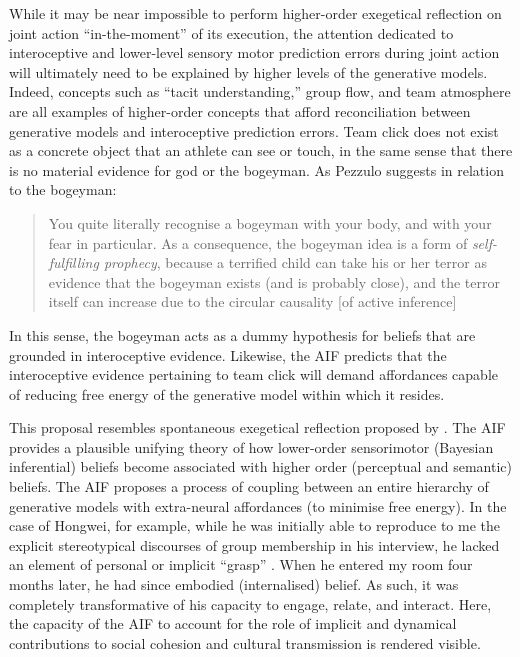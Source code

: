\begin{CJK}{UTF8}{gbsn}

While it may be near impossible to perform higher-order exegetical reflection on joint action ``in-the-moment'' of its execution, the attention dedicated to interoceptive and lower-level sensory motor prediction errors during joint action will ultimately need to be explained by higher levels of the generative models. Indeed, concepts such as ``tacit understanding,'' group flow, and team atmosphere are all examples of higher-order concepts that afford reconciliation between generative models and interoceptive prediction errors.  Team click does not exist as a concrete object that an athlete can see or touch, in the same sense that there is no material evidence for god or the bogeyman.  As Pezzulo suggests in relation to the bogeyman:

    \begin{quote}
      You quite literally recognise a bogeyman with your body, and with your fear in particular.  As a consequence, the bogeyman idea is a form of \textit{self-fulfilling prophecy}, because a terrified child can take his or her terror as evidence that the bogeyman exists (and is probably close), and the terror itself can increase due to the circular causality [of active inference] \citep[909]{Pezzulo2014}
    \end{quote}

In this sense, the bogeyman acts as a dummy hypothesis for beliefs that are grounded in interoceptive evidence.  Likewise, the AIF predicts that the interoceptive evidence pertaining to team click will demand affordances capable of reducing free energy of the generative model within which it resides.

This proposal resembles spontaneous exegetical reflection proposed by \textcite{Boyer2006}. The AIF provides a plausible unifying theory of how lower-order sensorimotor (Bayesian inferential) beliefs become associated with higher order (perceptual and semantic) beliefs.  The AIF proposes a process of coupling between an entire hierarchy of generative models with extra-neural affordances (to minimise free energy).  In the case of Hongwei, for example, while he was initially able to reproduce to me the explicit stereotypical discourses of group membership in his interview, he lacked an element of personal or implicit ``grasp'' \citep{Yufik2013}.  When he entered my room four months later, he had since embodied (internalised) belief. As such, it was completely transformative of his capacity to engage, relate, and interact. Here, the capacity of the AIF to account for the role of implicit and dynamical contributions to social cohesion and cultural transmission is rendered visible.









\end{CJK}
